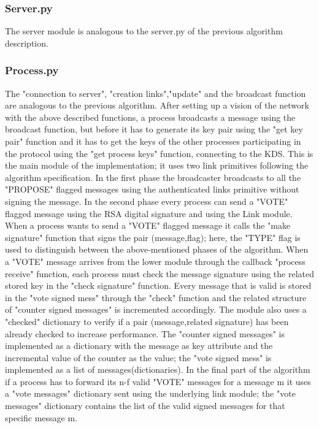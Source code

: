 \documentclass[12pt]{article}
\begin{document}
\subsubsection{Server.py}
The server module is analogous to the server.py of the previous algorithm description. \\
\subsubsection{Process.py}
The "connection to server", "creation links","update" and the broadcast function are analogous to the previous algorithm. After setting up a vision of the network with the above described functions, a process broadcasts a message using the broadcast function, but before it has to generate its key pair using the "get key pair" function and it has to get the keys of the other processes participating in the protocol using the "get process keys" function, connecting to the KDS.
This is the main module of the implementation; it uses two link primitives following the algorithm specification. In the first phase the broadcaster broadcasts to all the "PROPOSE" flagged messages using the authenticated links primitive without signing the message.
In the second phase every process can send a "VOTE" flagged message using the RSA digital signature and using the Link module.
When a process wants to send a "VOTE" flagged message it calls the "make signature" function that signs the pair (message,flag); here, the "TYPE" flag is used to distinguish between the above-mentioned phases of the algorithm. When a "VOTE" message arrives from the lower module through the callback "process receive" function, each process must check the message signature using the related stored key in the "check signature" function. Every message that is valid is stored in the "vote signed mess" through the "check" function and the related structure of "counter signed messages" is incremented accordingly. The module also uses a "checked" dictionary to verify if a pair (message,related signature) has been already checked to increase performance. The "counter signed messages" is implemented as a dictionary with the message as key attribute and the incremental value of the counter as the value; the "vote signed mess" is implemented as a list of messages(dictionaries). In the final part of the algorithm if a process has to forward its n-f valid "VOTE" messages for a message m it uses a "vote messages" dictionary sent using the underlying link module; the "vote messages" dictionary contains the list of the valid signed messages for that specific message m. \\
\end{document}
